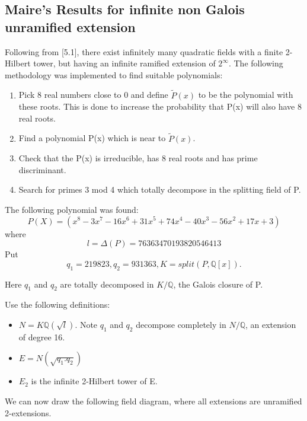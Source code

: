\documentclass[12pt]{extarticle}
\newcommand{\<}{\langle}
\renewcommand{\>}{\rangle}
\theoremstyle{definition}
\begin{document}
\subsection{Maire's Results for infinite non Galois unramified extension}
Following from \cite{MAIR}[5.1], there exist infinitely many quadratic fields with a finite 2-Hilbert tower, but having an infinite ramified extension of $2^{\infty{}}$. 
The following methodology was implemented  to find suitable polynomials:
\begin{enumerate}
    \item Pick 8 real numbers close to 0 and define $\tilde{P}(x)$ to be the polynomial with these roots. This is done to increase the probability that P(x) will also have 8 real roots. 
    \item Find a polynomial P(x) which is near to $\tilde{P}(x)$.
    \item Check that the P(x) is irreducible, has 8 real roots and has prime discriminant. 
    \item Search for primes 3 mod 4 which totally decompose in the splitting field of P. 
\end{enumerate}
The following polynomial was found: 
\begin{equation}
    P(X) = (x^8 - 3x^7 - 16x^6 + 31x^5 + 74x^4 - 40x^3 - 56x^2 + 17x + 3)
\end{equation}
where 
\begin{equation}
    l = \Delta(P) = 76363470193820546413
\end{equation}
Put \begin{equation}
    q_1 = 219823, q_2 = 931363, K = split(P, \mathbb{Q}[x]).
\end{equation}
\par
Here $q_1$ and  $q_2$ are totally decomposed in $K/\mathbb{Q}$, the Galois closure of P.
\par
Use the following definitions: 
\begin{itemize}
    \item $N = K\mathbb{Q}(\sqrt{l})$. Note $q_1$ and $q_2$ decompose completely in $N/\mathbb{Q}$, an extension of degree 16.
    \item $E = N(\sqrt{q_1.q_2})$
    \item $E_2$ is the infinite 2-Hilbert tower of E.
\end{itemize}
\par 
We can now draw the following field diagram, where all extensions are unramified 2-extensions. 
\end{document}
